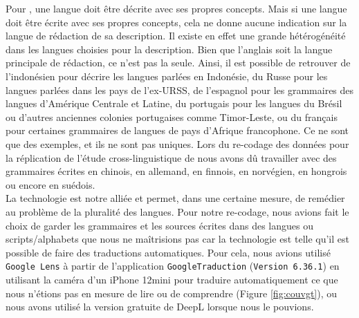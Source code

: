 Pour \citeauthor{haspelmathComparativeConceptsDescriptive2010} \parencite*{haspelmathComparativeConceptsDescriptive2010,haspelmathChallengeMakingLanguage2016}, une langue doit être décrite avec ses propres concepts.  Mais si une langue doit être écrite avec ses propres concepts, cela ne donne aucune indication sur la langue de rédaction de sa description. 
Il existe en effet une grande hétérogénéité dans les langues choisies pour la description. Bien que l'anglais soit la langue principale de rédaction, ce n'est pas la seule. 
Ainsi, il est possible de retrouver de l'indonésien pour décrire les langues parlées en Indonésie, du Russe pour les langues parlées dans les pays de l'ex-URSS, de l'espagnol pour les grammaires des langues d'Amérique Centrale et Latine, du portugais pour les langues du Brésil ou d'autres anciennes colonies portugaises comme Timor-Leste, ou du français pour certaines grammaires de langues de pays d'Afrique francophone. Ce ne sont que des exemples, et ils ne sont pas uniques. Lors du re-codage des données pour la réplication de l'étude cross-linguistique de \textcite{winterTrilledAssociatedRoughness2022} nous avons dû travailler avec des grammaires écrites en chinois, en allemand, en finnois, en norvégien, en hongrois ou encore en suédois.\\

La technologie est notre alliée et permet, dans une certaine mesure, de remédier au problème de la pluralité des langues. Pour notre re-codage, nous avions fait le choix de garder les grammaires et les sources écrites dans des langues ou scripts/alphabets que nous ne maîtrisions pas car la technologie est telle qu'il est possible de faire des traductions automatiques. Pour cela, nous avions utilisé \texttt{Google Lens} à partir de l'application \texttt{GoogleTraduction} (\texttt{Version 6.36.1}) en utilisant la caméra d'un iPhone 12mini pour traduire automatiquement ce que nous n'étions pas en mesure de lire ou de comprendre (Figure \ref{fig:couvgt}), ou nous avons utilisé la version gratuite de DeepL lorsque nous le pouvions.


